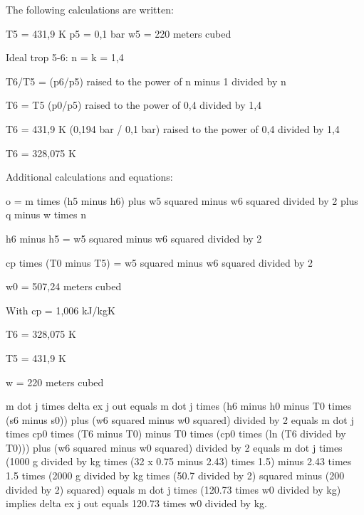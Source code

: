 The following calculations are written:

T5 = 431,9 K
p5 = 0,1 bar
w5 = 220 meters cubed

Ideal trop 5-6: n = k = 1,4

T6/T5 = (p6/p5) raised to the power of n minus 1 divided by n

T6 = T5 (p0/p5) raised to the power of 0,4 divided by 1,4

T6 = 431,9 K (0,194 bar / 0,1 bar) raised to the power of 0,4 divided by 1,4

T6 = 328,075 K

Additional calculations and equations:

o = m times (h5 minus h6) plus w5 squared minus w6 squared divided by 2 plus q minus w times n

h6 minus h5 = w5 squared minus w6 squared divided by 2

cp times (T0 minus T5) = w5 squared minus w6 squared divided by 2

w0 = 507,24 meters cubed

With cp = 1,006 kJ/kgK

T6 = 328,075 K

T5 = 431,9 K

w = 220 meters cubed

m dot j times delta ex j out equals m dot j times (h6 minus h0 minus T0 times (s6 minus s0)) plus (w6 squared minus w0 squared) divided by 2 equals m dot j times cp0 times (T6 minus T0) minus T0 times (cp0 times (ln (T6 divided by T0))) plus (w6 squared minus w0 squared) divided by 2 equals m dot j times (1000 g divided by kg times (32 x 0.75 minus 2.43) times 1.5) minus 2.43 times 1.5 times (2000 g divided by kg times (50.7 divided by 2) squared minus (200 divided by 2) squared) equals m dot j times (120.73 times w0 divided by kg) implies delta ex j out equals 120.73 times w0 divided by kg.